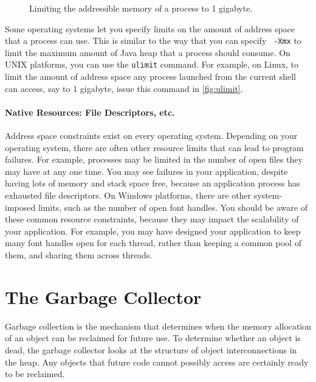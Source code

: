 \begin{figure}
\begin{framedlisting}
\end{framedlisting}
\caption{Limiting the addressible memory of a process to 1 gigabyte.}
\label{fig:ulimit}
\end{figure}
Some operating systems let you specify limits on the amount of address space
that a process can use. This is similar to the way that you can specify {\tt
-Xmx} to limit the maximum amount of Java heap that a process should consume. On
UNIX platforms, you can use the {\tt ulimit} command. For example, on Linux, to
limit the amount of address space any process launched from the current shell
can access, say to 1 gigabyte, issue this command in \autoref{fig:ulimit}.

\paragraph{Native Resources: File Descriptors, etc.}
Address space constraints exist on every operating system. Depending on your
operating system, there are often other resource limits that can lead to program
failures. For example, processes may be limited in the number of open files they
may have at any one time. You may see failures in your application, despite
having lots of memory and stack space free, because an application process has
exhausted file descriptors. On Windows platforms, there are other system-imposed
limits, such as the number of open font handles. You should be aware of these
common resource constraints, because they may impact the scalability of your
application. For example, you may have designed your application to keep many
font handles open for each thread, rather than keeping a common pool of them,
and sharing them across threads.

\section{The Garbage Collector}
Garbage collection is the mechanism that determines when the memory allocation
of an object can be reclaimed for future use. To determine whether an object is
dead, the garbage collector looks at the structure of object interconnections in
the heap. Any objects that future code cannot possibly access are certainly
ready to be reclaimed. 

